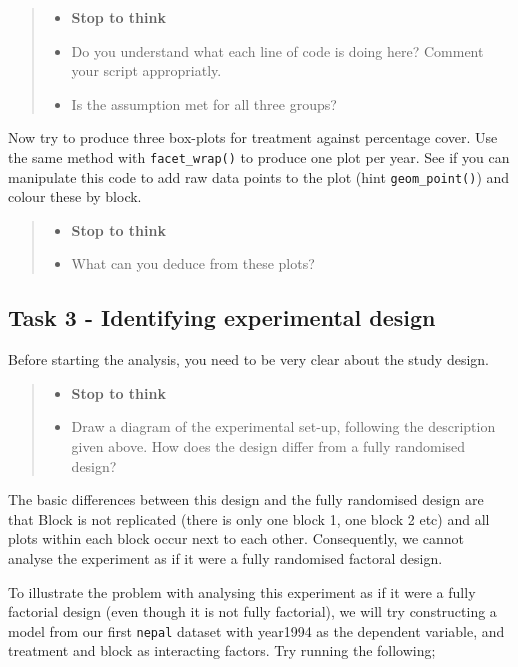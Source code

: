 \documentclass[
]{book}
\providecommand{\tightlist}{%
  \setlength{\itemsep}{0pt}\setlength{\parskip}{0pt}}
\begin{document}
\begin{quote}
\begin{itemize}
\tightlist
\item
  \textbf{Stop to think}
\item
  Do you understand what each line of code is doing here? Comment your script appropriatly.
\item
  Is the assumption met for all three groups?
\end{itemize}
\end{quote}

Now try to produce three box-plots for treatment against percentage cover. Use the same method with \texttt{facet\_wrap()} to produce one plot per year. See if you can manipulate this code to add raw data points to the plot (hint \texttt{geom\_point()}) and colour these by block.

\begin{quote}
\begin{itemize}
\tightlist
\item
  \textbf{Stop to think}
\item
  What can you deduce from these plots?
\end{itemize}
\end{quote}

\subsection{Task 3 - Identifying experimental design}\label{c12t3}

Before starting the analysis, you need to be very clear about the study design.

\begin{quote}
\begin{itemize}
\tightlist
\item
  \textbf{Stop to think}
\item
  Draw a diagram of the experimental set-up, following the description given above. How does the design differ from a fully randomised design?
\end{itemize}
\end{quote}

The basic differences between this design and the fully randomised design are that Block is not replicated (there is only one block 1, one block 2 etc) and all plots within each block occur next to each other. Consequently, we cannot analyse the experiment as if it were a fully randomised factoral design.

To illustrate the problem with analysing this experiment as if it were a fully factorial design (even though it is not fully factorial), we will try constructing a model from our first \texttt{nepal} dataset with year1994 as the dependent variable, and treatment and block as interacting factors. Try running the following;
\end{document}
